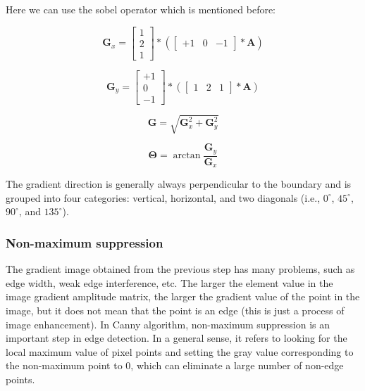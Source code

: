 \documentclass[review]{cvpr}
\begin{document}
Here we can use the sobel operator which is mentioned before:

\begin{equation}
  \mathbf{G}_{x}=\left[\begin{array}{l}
1 \\
2 \\
1
\end{array}\right] *\left(\left[\begin{array}{lll}
+1 & 0 & -1
\end{array}\right] * \mathbf{A}\right)
\end{equation}

\begin{equation}
  \mathbf{G}_{y}=\left[\begin{array}{c}
+1 \\
0 \\
-1
\end{array}\right] *\left(\left[\begin{array}{lll}
1 & 2 & 1
\end{array}\right] * \mathbf{A}\right)
\end{equation}

\begin{equation}
  \mathbf{G}=\sqrt{\mathbf{G}_{x}^{2}+\mathbf{G}_{y}^{2}}
\end{equation}

\begin{equation}
  \boldsymbol{\Theta}=\arctan \frac{\mathbf{G}_{y}}{\mathbf{G}_{x}}
\end{equation}

The gradient direction is generally always perpendicular to the boundary and is grouped into four categories: vertical, horizontal, and two diagonals (i.e., $0^\circ$, $45^\circ$, $90^\circ$, and $135^\circ$).

\subsubsection{Non-maximum suppression}

The gradient image obtained from the previous step has many problems, such as edge width, weak edge interference, etc. The larger the element value in the image gradient amplitude matrix, the larger the gradient value of the point in the image, but it does not mean that the point is an edge (this is just a process of image enhancement). In Canny algorithm, non-maximum suppression is an important step in edge detection. In a general sense, it refers to looking for the local maximum value of pixel points and setting the gray value corresponding to the non-maximum point to 0, which can eliminate a large number of non-edge points.
\end{document}
